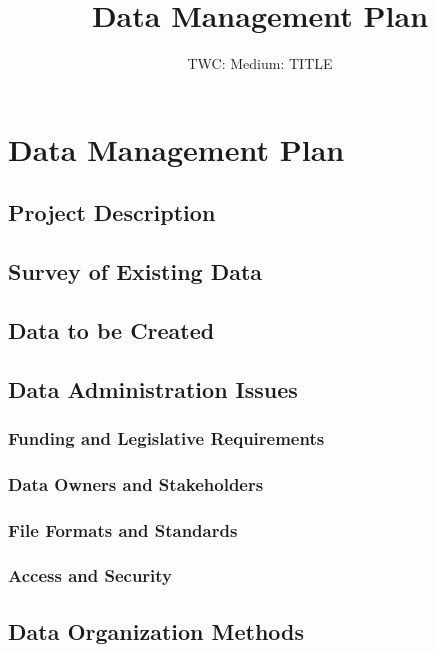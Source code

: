\documentclass[letterpaper,twoside,11pt,headings=small]{scrartcl}
\newcommand{\thetitle}{TWC: Medium: TITLE\xspace}
\begin{document}
\title{Data Management Plan}
\subtitle{\thetitle}
\author{}
\date{}
\maketitle

\section{Data Management Plan}
\label{sec:dmp}

\subsection{Project Description}
\label{sec:dmp:desc}

\subsection{Survey of Existing Data}
\label{sec:dmp:survey}

\subsection{Data to be Created}
\label{sec:dmp:created}

\subsection{Data Administration Issues}
\label{sec:dmp:admin}

\subsubsection*{Funding and Legislative Requirements}

\subsubsection*{Data Owners and Stakeholders}

\subsubsection*{File Formats and Standards}

\subsubsection*{Access and Security}

\subsection{Data Organization Methods}
\end{document}
